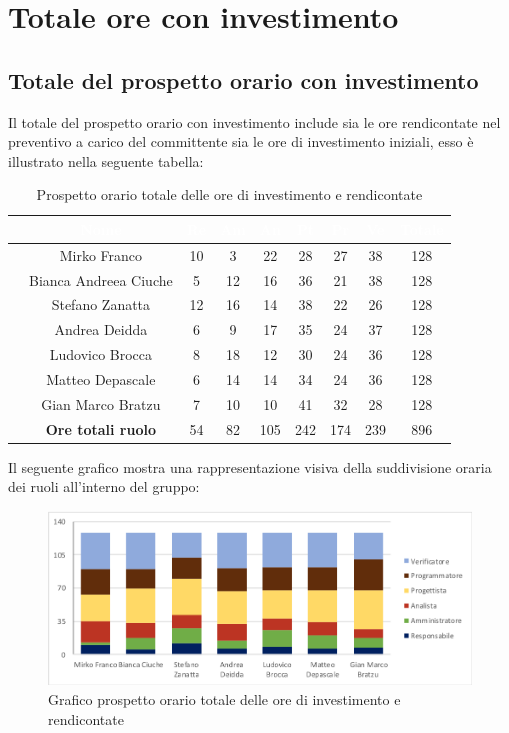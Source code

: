 \section{Totale ore con investimento}
\subsection{Totale del prospetto orario con investimento}
Il totale del prospetto orario con investimento include sia le ore rendicontate nel preventivo a carico del committente sia le ore di investimento iniziali, esso è illustrato nella seguente tabella:

\begin{table}[ht]
	\begin{center}
		\begin{tabular}{ccccccccc}
			\rowcolor{coolblack}
			\hline
			& \textcolor{white}{Nome} & \textcolor{white}{Re} & \textcolor{white}{Am} & \textcolor{white}{An} & \textcolor{white}{Pt} &\textcolor{white}{Pr} & \textcolor{white}{Ve} & \textcolor{white}{Totale} \\
			\hline
			&Mirko Franco & 10 & 3 & 22 & 28& 27 & 38 & 128  \\
			&Bianca Andreea Ciuche & 5& 12& 16& 36 & 21& 38 &128 \\
			&Stefano Zanatta & 12 & 16& 14 & 38 & 22 & 26 & 128\\
			&Andrea Deidda &  6& 9 & 17 &35 & 24 & 37 & 128\\
			&Ludovico Brocca & 8& 18 & 12 & 30 & 24 & 36 & 128 \\
			&Matteo Depascale & 6& 14& 14& 34& 24& 36& 128\\
			&Gian Marco Bratzu & 7& 10 & 10 & 41 & 32 & 28 &128 \\
			\hline
			&\textbf{Ore totali ruolo} & 54& 82 & 105 & 242 & 174 & 239 & 896 \\
		\end{tabular}
		\caption{Prospetto orario totale delle ore di investimento e rendicontate}
	\end{center}
\end{table}

Il seguente grafico mostra una rappresentazione visiva della suddivisione oraria dei ruoli all'interno del gruppo:
\begin{figure}[!ht]
	\begin{center}
		\includegraphics[scale=0.80]{images/grafoOreInvestimento.png}
		\caption{Grafico prospetto orario totale delle ore di investimento e rendicontate}
	\end{center}
\end{figure}
\newpage

